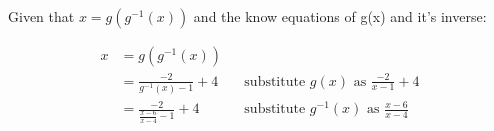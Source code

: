 \documentclass[12pt]{book}
\begin{document}
\begin{enumerate}
\begin{center}
    Given that $x = g(g^{-1}(x))$ and the know equations of g(x) and it's inverse:
\end{center}
\vspace{-2em}

\begin{align*}
    x &= g(g^{-1}(x)) \\
    &= \frac{-2}{g^{-1}(x)-1}+4 && \text{substitute $g(x)$ as $\frac{-2}{x-1}+4$} \\
    &= \frac{-2}{\frac{x-6}{x-4}-1}+4 && \text{substitute $g^{-1}(x)$ as $\frac{x-6}{x-4}$} \\
\end{align*}

\newpage

\end{enumerate}
\end{document}
